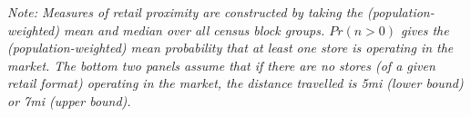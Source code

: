 {{\begin{threeparttable}
\begin{tablenotes}
  \small
  \item \textit{Note: Measures of retail proximity are constructed by taking the (population-weighted) mean and median over all census block groups. $Pr(n>0)$ gives the (population-weighted) mean probability that at least one store is operating in the market.
  The bottom two panels assume that if there are no stores (of a given retail format) operating in the market, the distance travelled is 5mi (lower bound) or 7mi (upper bound).}
  \end{tablenotes}
\end{threeparttable}} 
  }